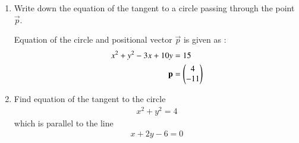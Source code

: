 \renewcommand{\theequation}{\theenumi}
\renewcommand{\thefigure}{\theenumi}
\begin{enumerate}[label=\thesubsection.\arabic*.,ref=\thesubsection.\theenumi]


\item Write down the equation of the tangent to a circle passing through the point $\vec{p}$. 

Equation of the circle and positional vector $\vec{p}$ is given as :
\begin{align}
    x^2+y^2-3x+10y&=15\label{eq:solutions/18/1/eq:0}\\
    \mathbf{p}&=\begin{pmatrix}4\\-11\end{pmatrix}
\end{align}
\solution

\item Find equation of the tangent to the circle
\begin{align}
  x^2 + y^2 = 4 \label{eq:solutions/18/3/Latex/eq:1}
\end{align}
which is parallel to the line
\begin{align}
  x+2y-6=0  \label{eq:solutions/18/3/Latex/eq:2}
\end{align}
%
\solution

\end{enumerate}
